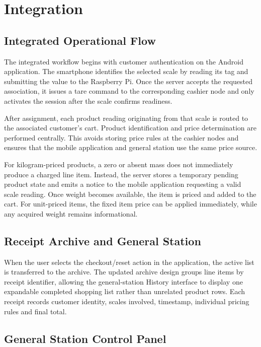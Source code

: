 \documentclass[11pt,a4paper]{article}
\begin{document}
\section{Integration}

\subsection{Integrated Operational Flow}

The integrated workflow begins with customer authentication on the Android application. The smartphone identifies the selected scale by reading its tag and submitting the value to the Raspberry Pi. Once the server accepts the requested association, it issues a tare command to the corresponding cashier node and only activates the session after the scale confirms readiness.

After assignment, each product reading originating from that scale is routed to the associated customer's cart. Product identification and price determination are performed centrally. This avoids storing price rules at the cashier nodes and ensures that the mobile application and general station use the same price source.

For kilogram-priced products, a zero or absent mass does not immediately produce a charged line item. Instead, the server stores a temporary pending product state and emits a notice to the mobile application requesting a valid scale reading. Once weight becomes available, the item is priced and added to the cart. For unit-priced items, the fixed item price can be applied immediately, while any acquired weight remains informational.

\subsection{Receipt Archive and General Station}

When the user selects the checkout/reset action in the application, the active list is transferred to the archive. The updated archive design groups line items by receipt identifier, allowing the general-station History interface to display one expandable completed shopping list rather than unrelated product rows. Each receipt records customer identity, scales involved, timestamp, individual pricing rules and final total.

\subsection{General Station Control Panel}
\end{document}
